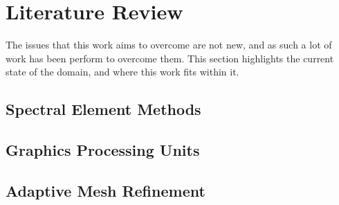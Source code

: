 \chapter{Literature Review}\label{chapter:literature_review} 

The issues that this work aims to overcome are not new, and as such a lot of work has been perform
to overcome them. This section highlights the current state of the domain, and where this work fits
within it.

\section{Spectral Element Methods}\label{section:literature_review:sem}

\section{Graphics Processing Units}\label{section:literature_review:gpu}

\section{Adaptive Mesh Refinement}\label{section:literature_review:amr}
~\cite{Schive2018}

